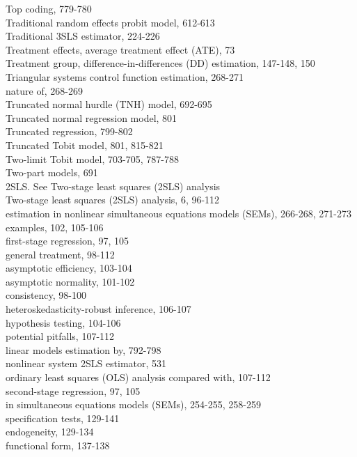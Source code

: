 \documentclass[10pt]{article}
\begin{document}
Top coding, 779-780\\
Traditional random effects probit model, 612-613\\
Traditional 3SLS estimator, 224-226\\
Treatment effects, average treatment effect (ATE), 73\\
Treatment group, difference-in-differences (DD) estimation, 147-148, 150\\
Triangular systems control function estimation, 268-271\\
nature of, 268-269\\
Truncated normal hurdle (TNH) model, 692-695\\
Truncated normal regression model, 801\\
Truncated regression, 799-802\\
Truncated Tobit model, 801, 815-821\\
Two-limit Tobit model, 703-705, 787-788\\
Two-part models, 691\\
2SLS. See Two-stage least squares (2SLS) analysis\\
Two-stage least squares (2SLS) analysis, 6, 96-112\\
estimation in nonlinear simultaneous equations models (SEMs), 266-268, 271-273\\
examples, 102, 105-106\\
first-stage regression, 97, 105\\
general treatment, 98-112\\
asymptotic efficiency, 103-104\\
asymptotic normality, 101-102\\
consistency, 98-100\\
heteroskedasticity-robust inference, 106-107\\
hypothesis testing, 104-106\\
potential pitfalls, 107-112\\
linear models estimation by, 792-798\\
nonlinear system 2SLS estimator, 531\\
ordinary least squares (OLS) analysis compared with, 107-112\\
second-stage regression, 97, 105\\
in simultaneous equations models (SEMs), 254-255, 258-259\\
specification tests, 129-141\\
endogeneity, 129-134\\
functional form, 137-138\\
\end{document}
